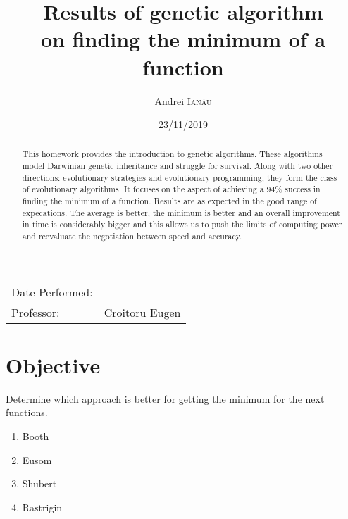 \documentclass{article}
\title{Results of genetic algorithm \\ on finding the minimum of a function} %
\author{Andrei \textsc{Ianău}} %
\begin{document}
\maketitle %

\begin{center}
\begin{tabular}{l r}
Date Performed: & \date{23/11/2019} \\ %
Professor: & Croitoru Eugen %
\end{tabular}
\end{center}



\begin{abstract}


This homework provides the introduction to genetic algorithms.
These algorithms model Darwinian genetic inheritance and struggle for survival. Along with two other directions: evolutionary strategies and evolutionary programming, they form the class of evolutionary algorithms.
It focuses on the aspect of achieving a 94\% success in finding the minimum of a function. 
Results are as expected in the good range of expecations. The average is better, the minimum is better and an overall improvement in time is considerably bigger and this allows us to push the limits of computing power and reevaluate the negotiation between speed and accuracy.


\end{abstract}


\section{Objective}

Determine which approach is better for getting the minimum for the next functions.
\begin{enumerate}
	\item Booth
	\item Eusom
	\item Shubert
	\item Rastrigin
\end{enumerate}
\end{document}
